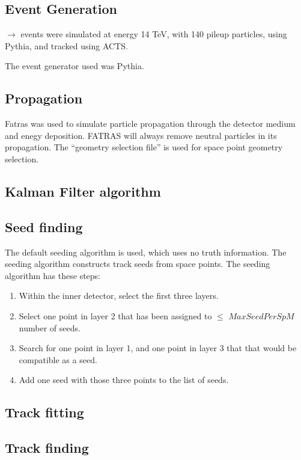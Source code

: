 \documentclass{article}
\begin{document}
\subsection{Event Generation}

\qqbar $\rightarrow$ \ttbar events were simulated at energy 14 TeV, with 140 pileup particles, using Pythia, and tracked using ACTS.

The event generator used was Pythia.

\subsection{Propagation}

Fatras was used to simulate particle propagation through the detector medium and enegy deposition. FATRAS will always remove neutral particles in its propagation. The ``geometry selection file'' is used for space point geometry selection.

\subsection{Kalman Filter algorithm}

\subsection{Seed finding}

The default seeding algorithm is used, which uses no truth information. The seeding algorithm constructs track seeds from space points. The seeding algorithm has these steps:

\begin{enumerate}
\item Within the inner detector, select the first three layers.
\item Select one point in layer 2 that has been assigned to $\leq$ $MaxSeedPerSpM$ number of seeds.
\item Search for one point in layer 1, and one point in layer 3 that that would be compatible as a seed.
\item Add one seed with those three points to the list of seeds.
\end{enumerate}

\subsection{Track fitting}

\subsection{Track finding}
\end{document}
